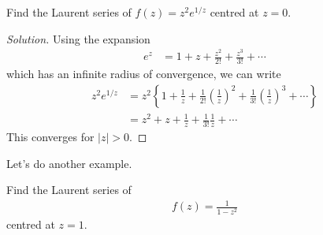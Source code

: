 \begin{example}
    Find the Laurent series of $f(z) = z^2 e^{1/z}$ centred at $z = 0$.
\end{example}
\begin{proof}[Solution]
    Using the expansion
    \begin{align}
        e^{z} &=
        1
        + z
        + \frac{z^2}{2!}
        + \frac{z^3}{3!}
        + \cdots
    \end{align}
    which has an infinite radius of convergence,
    we can write
    \begin{align}
        z^2 e^{1/z}
        &= z^2\left\{
            1
            + \frac{1}{z}
            + \frac{1}{2!}\left(\frac{1}{z} \right)^2
            + \frac{1}{3!}\left(\frac{1}{z} \right)^3
            + \cdots
        \right\}\\
        &= z^2 + z + \frac{1}{z} + \frac{1}{3!}\frac{1}{z} + \cdots
    \end{align}
    This converges for $|z|>0$.
\end{proof}
Let's do another example.
\begin{example}
    Find the Laurent series of
    \begin{align}
        f(z) = \frac{1}{1 - z^2}
    \end{align}
    centred at $z=1$.
\end{example}
